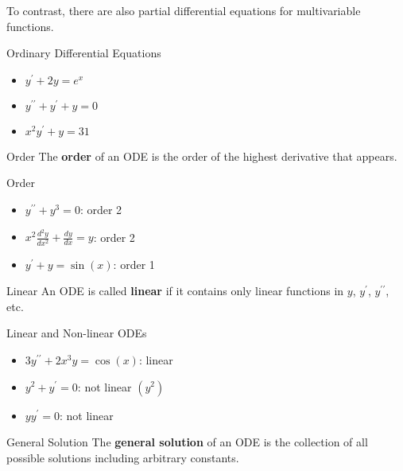 \begin{Remark}{}{}
    To contrast, there are also partial differential equations for multivariable functions.
\end{Remark}

\begin{Example}{Ordinary Differential Equations}{}
    \begin{itemize}
        \item $ y^\prime+2y=e^x $
        \item $ y^{\prime\prime}+y^\prime+y=0 $
        \item $ x^2y^\prime+y=31 $
    \end{itemize}
\end{Example}

\begin{Definition}{Order}{}
    The \textbf{order} of an ODE is the order of the highest derivative that appears.
\end{Definition}

\begin{Example}{Order}{}
    \begin{itemize}
        \item $ y^{\prime\prime}+y^3=0 $: order 2
        \item $ x^2 \frac{d^2y}{dx^2} +\frac{dy}{dx} =y $: order 2
        \item $ y^\prime+y=\sin(x) $: order 1
    \end{itemize}
\end{Example}

\begin{Definition}{Linear}{}
    An ODE is called \textbf{linear} if it contains only linear functions in $ y $, $ y^\prime $,
    $ y^{\prime\prime} $, etc.
\end{Definition}

\begin{Example}{Linear and Non-linear ODEs}{}
    \begin{itemize}
        \item $ 3y^{\prime\prime}+2x^3y=\cos(x) $: linear
        \item $ y^2+y^\prime=0 $: not linear $ (y^2) $
        \item $ yy^\prime=0 $: not linear
    \end{itemize}
\end{Example}

\begin{Definition}{General Solution}{}
    The \textbf{general solution} of an ODE is the collection of all possible
    solutions including arbitrary constants.
\end{Definition}

